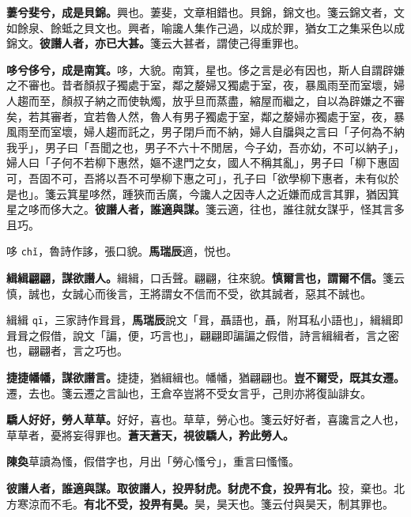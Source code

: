 \textbf{萋兮斐兮，成是貝錦。}{\footnotesize 興也。萋斐，文章相錯也。貝錦，錦文也。箋云錦文者，文如餘泉、餘蚳之貝文也。興者，喻讒人集作己過，以成於罪，猶女工之集采色以成錦文。}\textbf{彼譖人者，亦已大甚。}{\footnotesize 箋云大甚者，謂使己得重罪也。}

\textbf{哆兮侈兮，成是南箕。}{\footnotesize 哆，大貌。南箕，星也。侈之言是必有因也，斯人自謂辟嫌之不審也。昔者顏叔子獨處于室，鄰之嫠婦又獨處于室，夜，暴風雨至而室壞，婦人趨而至，顏叔子納之而使執燭，放乎旦而蒸盡，縮屋而繼之，自以為辟嫌之不審矣，若其審者，宜若魯人然，魯人有男子獨處于室，鄰之嫠婦亦獨處于室，夜，暴風雨至而室壞，婦人趨而託之，男子閉戶而不納，婦人自牖與之言曰「子何為不納我乎」，男子曰「吾聞之也，男子不六十不閒居，今子幼，吾亦幼，不可以納子」，婦人曰「子何不若柳下惠然，嫗不逮門之女，國人不稱其亂」，男子曰「柳下惠固可，吾固不可，吾將以吾不可學柳下惠之可」，孔子曰「欲學柳下惠者，未有似於是也」。箋云箕星哆然，踵狹而舌廣，今讒人之因寺人之近嫌而成言其罪，猶因箕星之哆而侈大之。}\textbf{彼譖人者，誰適與謀。}{\footnotesize 箋云適，往也，誰往就女謀乎，怪其言多且巧。}

\begin{quoting}哆 \texttt{chǐ}，魯詩作誃，張口貌。\textbf{馬瑞辰}適，悦也。\end{quoting}

\textbf{緝緝翩翩，謀欲譖人。}{\footnotesize 緝緝，口舌聲。翩翩，往來貌。}\textbf{慎爾言也，謂爾不信。}{\footnotesize 箋云慎，誠也，女誠心而後言，王將謂女不信而不受，欲其誠者，惡其不誠也。}

\begin{quoting}緝緝 \texttt{qī}，三家詩作咠咠，\textbf{馬瑞辰}說文「咠，聶語也，聶，附耳私小語也」，緝緝即咠咠之假借，說文「諞，便，巧言也」，翩翩即諞諞之假借，詩言緝緝者，言之密也，翩翩者，言之巧也。\end{quoting}

\textbf{捷捷幡幡，謀欲譖言。}{\footnotesize 捷捷，猶緝緝也。幡幡，猶翩翩也。}\textbf{豈不爾受，既其女遷。}{\footnotesize 遷，去也。箋云遷之言訕也，王倉卒豈將不受女言乎，己則亦將復訕誹女。}

\textbf{驕人好好，勞人草草。}{\footnotesize 好好，喜也。草草，勞心也。箋云好好者，喜讒言之人也，草草者，憂將妄得罪也。}\textbf{蒼天蒼天，視彼驕人，矜此勞人。}

\begin{quoting}\textbf{陳奐}草讀為慅，假借字也，月出「勞心慅兮」，重言曰慅慅。\end{quoting}

\textbf{彼譖人者，誰適與謀。取彼譖人，投畀豺虎。豺虎不食，投畀有北。}{\footnotesize 投，棄也。北方寒涼而不毛。}\textbf{有北不受，投畀有昊。}{\footnotesize 昊，昊天也。箋云付與昊天，制其罪也。}


